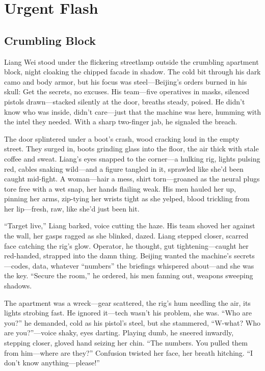 \documentclass[12pt]{book}
\begin{document}
\chapter{Urgent Flash}
\section{Crumbling Block}

Liang Wei stood under the flickering streetlamp outside the crumbling apartment block, night cloaking the chipped facade in shadow. The cold bit through his dark camo and body armor, but his focus was steel—Beijing’s orders burned in his skull: Get the secrets, no excuses. His team—five operatives in masks, silenced pistols drawn—stacked silently at the door, breaths steady, poised. He didn’t know who was inside, didn’t care—just that the machine was here, humming with the intel they needed. With a sharp two-finger jab, he signaled the breach.

The door splintered under a boot’s crash, wood cracking loud in the empty street. They surged in, boots grinding glass into the floor, the air thick with stale coffee and sweat. Liang’s eyes snapped to the corner—a hulking rig, lights pulsing red, cables snaking wild—and a figure tangled in it, sprawled like she’d been caught mid-fight. A woman—hair a mess, shirt torn—groaned as the neural plugs tore free with a wet snap, her hands flailing weak. His men hauled her up, pinning her arms, zip-tying her wrists tight as she yelped, blood trickling from her lip—fresh, raw, like she’d just been hit.

“Target live,” Liang barked, voice cutting the haze. His team shoved her against the wall, her gasps ragged as she blinked, dazed. Liang stepped closer, scarred face catching the rig’s glow. Operator, he thought, gut tightening—caught her red-handed, strapped into the damn thing. Beijing wanted the machine’s secrets—codes, data, whatever “numbers” the briefings whispered about—and she was the key. “Secure the room,” he ordered, his men fanning out, weapons sweeping shadows.

The apartment was a wreck—gear scattered, the rig’s hum needling the air, its lights strobing fast. He ignored it—tech wasn’t his problem, she was. “Who are you?” he demanded, cold as his pistol’s steel, but she stammered, “W-what? Who are you?”—voice shaky, eyes darting. Playing dumb, he sneered inwardly, stepping closer, gloved hand seizing her chin. “The numbers. You pulled them from him—where are they?” Confusion twisted her face, her breath hitching. “I don’t know anything—please!”
\end{document}
